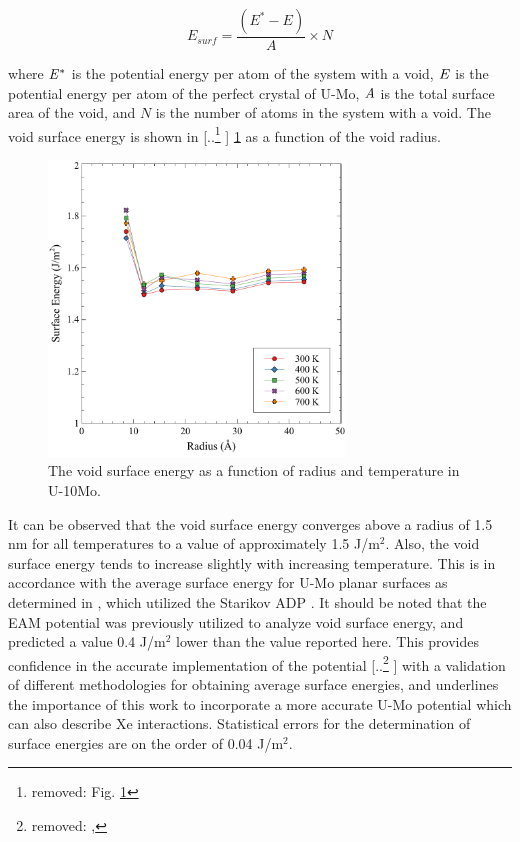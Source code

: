 \documentclass[review]{elsarticle}
\providecommand{\DIFaddtex}[1]{{\protect\color{blue} \sf #1}} %
\providecommand{\DIFdeltex}[1]{{\protect\color{red} [..\footnote{removed: #1} ]}} %
\providecommand{\DIFaddbegin}{} %
\providecommand{\DIFaddend}{} %
\providecommand{\DIFdelbegin}{} %
\providecommand{\DIFdelend}{} %
\providecommand{\DIFaddbeginFL}{} %
\providecommand{\DIFaddendFL}{} %
\providecommand{\DIFdelbeginFL}{} %
\providecommand{\DIFdelendFL}{} %
\providecommand{\DIFadd}[1]{\texorpdfstring{\DIFaddtex{#1}}{#1}} %
\providecommand{\DIFdel}[1]{\texorpdfstring{\DIFdeltex{#1}}{}} %
\newcommand{\DIFscaledelfig}{0.5}
\newlength{\DIFdelgraphicswidth} %
\newlength{\DIFdelgraphicsheight} %
\newcommand{\DIFaddincludegraphics}[2][]{{\color{blue}\fbox{\DIFOincludegraphics[#1]{#2}}}} %
\newcommand{\DIFdelincludegraphics}[2][]{%
\sbox{\DIFdelgraphicsbox}{\DIFOincludegraphics[#1]{#2}}%
\settoboxwidth{\DIFdelgraphicswidth}{\DIFdelgraphicsbox} %
\settoboxtotalheight{\DIFdelgraphicsheight}{\DIFdelgraphicsbox} %
\scalebox{\DIFscaledelfig}{%
\parbox[b]{\DIFdelgraphicswidth}{\usebox{\DIFdelgraphicsbox}\\[-\baselineskip] \rule{\DIFdelgraphicswidth}{0em}}\llap{\resizebox{\DIFdelgraphicswidth}{\DIFdelgraphicsheight}{%
\setlength{\unitlength}{\DIFdelgraphicswidth}%
\begin{picture}(1,1)%
\thicklines\linethickness{2pt} %
{\color[rgb]{1,0,0}\put(0,0){\framebox(1,1){}}}%
{\color[rgb]{1,0,0}\put(0,0){\line( 1,1){1}}}%
{\color[rgb]{1,0,0}\put(0,1){\line(1,-1){1}}}%
\end{picture}%
}\hspace*{3pt}}} %
} %
\DeclareRobustCommand{\DIFaddbegin}{\DIFOaddbegin \let\includegraphics\DIFaddincludegraphics} %
\DeclareRobustCommand{\DIFaddend}{\DIFOaddend \let\includegraphics\DIFOincludegraphics} %
\DeclareRobustCommand{\DIFdelbegin}{\DIFOdelbegin \let\includegraphics\DIFdelincludegraphics} %
\DeclareRobustCommand{\DIFdelend}{\DIFOaddend \let\includegraphics\DIFOincludegraphics} %
\DeclareRobustCommand{\DIFaddbeginFL}{\DIFOaddbeginFL \let\includegraphics\DIFaddincludegraphics} %
\DeclareRobustCommand{\DIFaddendFL}{\DIFOaddendFL \let\includegraphics\DIFOincludegraphics} %
\DeclareRobustCommand{\DIFdelbeginFL}{\DIFOdelbeginFL \let\includegraphics\DIFdelincludegraphics} %
\DeclareRobustCommand{\DIFdelendFL}{\DIFOaddendFL \let\includegraphics\DIFOincludegraphics} %
\begin{document}
\begin{equation}
\label{eq:surface}
E_{surf}= \frac{(E^{*} - E)}{A} \times N
\end{equation}

\noindent where $\it{E^{*}}$ is the potential energy per atom of the system with a void, $\it{E}$ is the potential energy per atom of the perfect crystal of U-Mo, $\it{A}$ is the total surface area of the void, and $\textit{N}$ is the number of atoms in the system with a void. The void surface energy is shown in \DIFdelbegin \DIFdel{Fig. \ref{fig:voidE} }\DIFdelend \DIFaddbegin \DIFadd{\cref{fig:voidE} }\DIFaddend as a function of the void radius. 

\begin{figure}[h!]
 \centering
 \DIFdelbeginFL %
\DIFdelendFL \DIFaddbeginFL \includegraphics[width=0.7\textwidth]{Esurf} 
 \DIFaddendFL \caption{The void surface energy as a function of radius and temperature in U-10Mo.}
 \label{fig:voidE}
\end{figure}

\noindent It can be observed that the void surface energy converges above a radius of 1.5 nm for all temperatures to a value of approximately 1.5 J/m$^2$. Also, the void surface energy tends to increase slightly with increasing temperature. This is in accordance with the average surface energy for U-Mo planar surfaces as determined in \cite{beeler2018}, which utilized the Starikov ADP \cite{starikov2018}. It should be noted that the EAM potential was previously utilized to analyze void surface energy, and predicted a value 0.4 J/m$^2$ lower than the value reported here. This provides confidence in the accurate implementation of the potential \DIFdelbegin \DIFdel{, }\DIFdelend \DIFaddbegin \DIFadd{with a }\DIFaddend validation of different methodologies for obtaining average surface energies, and underlines the importance of this work to incorporate a more accurate U-Mo potential which can also describe Xe interactions. \DIFaddbegin \DIFadd{Statistical errors for the determination of surface energies are on the order of 0.04 J/m$^2$. 
}\DIFaddend 
\end{document}
